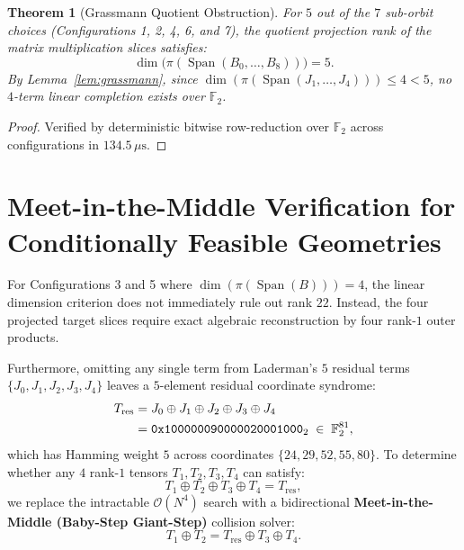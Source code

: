 \documentclass[11pt,reqno]{amsart}
\theoremstyle{plain}
\newtheorem{theorem}{Theorem}
\theoremstyle{definition}
\begin{document}
\begin{theorem}[Grassmann Quotient Obstruction]\label{thm:grassmann-obstruction}
For $5$ out of the $7$ sub-orbit choices (Configurations 1, 2, 4, 6, and 7), the quotient projection rank of the matrix multiplication slices satisfies:
\begin{equation}
\dim \bigl( \pi(\operatorname{Span}(B_0, \dots, B_8)) \bigr) = 5.
\end{equation}
By Lemma~\ref{lem:grassmann}, since $\dim(\pi(\operatorname{Span}(J_1, \dots, J_4))) \le 4 < 5$, no $4$-term linear completion exists over $\mathbb{F}_2$.
\end{theorem}

\begin{proof}
Verified by deterministic bitwise row-reduction over $\mathbb{F}_2$ across configurations in $134.5\,\mu\mathrm{s}$.
\end{proof}

\section{Meet-in-the-Middle Verification for Conditionally Feasible Geometries}

For Configurations 3 and 5 where $\dim(\pi(\operatorname{Span}(B))) = 4$, the linear dimension criterion does not immediately rule out rank $22$. Instead, the four projected target slices require exact algebraic reconstruction by four rank-$1$ outer products.

Furthermore, omitting any single term from Laderman's $5$ residual terms $\{J_0, J_1, J_2, J_3, J_4\}$ leaves a $5$-element residual coordinate syndrome:
\begin{align}
T_{\mathrm{res}} &= J_0 \oplus J_1 \oplus J_2 \oplus J_3 \oplus J_4 \notag \\
&= \mathtt{0x100000090000020001000}_2 \;\in\; \mathbb{F}_2^{81},
\end{align}
which has Hamming weight $5$ across coordinates $\{24, 29, 52, 55, 80\}$. To determine whether any $4$ rank-$1$ tensors $T_1, T_2, T_3, T_4$ can satisfy:
\begin{equation}
T_1 \oplus T_2 \oplus T_3 \oplus T_4 = T_{\mathrm{res}},
\end{equation}
we replace the intractable $\mathcal{O}(N^4)$ search with a bidirectional \textbf{Meet-in-the-Middle (Baby-Step Giant-Step)} collision solver:
\begin{equation}
T_1 \oplus T_2 = T_{\mathrm{res}} \oplus T_3 \oplus T_4.
\end{equation}
\end{document}

